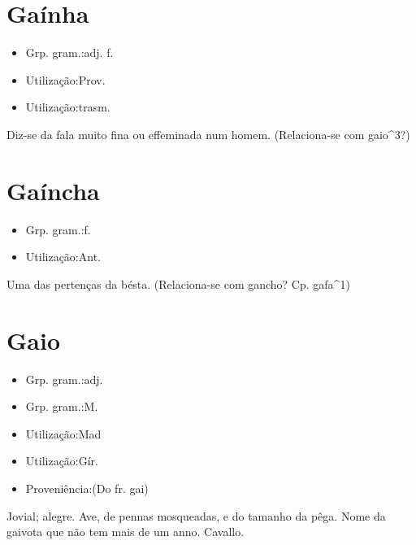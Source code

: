 \section{Gaínha}
\begin{itemize}
\item {Grp. gram.:adj. f.}
\end{itemize}
\begin{itemize}
\item {Utilização:Prov.}
\end{itemize}
\begin{itemize}
\item {Utilização:trasm.}
\end{itemize}
Diz-se da fala muito fina ou effeminada num homem.
(Relaciona-se com \textunderscore gaio\textunderscore ^3?)
\section{Gaíncha}
\begin{itemize}
\item {Grp. gram.:f.}
\end{itemize}
\begin{itemize}
\item {Utilização:Ant.}
\end{itemize}
Uma das pertenças da bésta.
(Relaciona-se com \textunderscore gancho\textunderscore ? Cp. \textunderscore gafa\textunderscore ^1)
\section{Gaio}
\begin{itemize}
\item {Grp. gram.:adj.}
\end{itemize}
\begin{itemize}
\item {Grp. gram.:M.}
\end{itemize}
\begin{itemize}
\item {Utilização:Mad}
\end{itemize}
\begin{itemize}
\item {Utilização:Gír.}
\end{itemize}
\begin{itemize}
\item {Proveniência:(Do fr. \textunderscore gai\textunderscore )}
\end{itemize}
Jovial; alegre.
Ave, de pennas mosqueadas, e do tamanho da pêga.
Nome da gaivota que não tem mais de um anno.
Cavallo.
